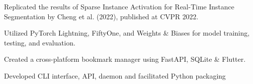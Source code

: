 \documentclass[]{resume-template}
\begin{document}
\begin{minipage}[t]{0.66\textwidth}
  \label{subsec:sparseinst}
  \begin{tightemize}
  \item Replicated the results of Sparse Instance Activation for
    Real-Time Instance Segmentation by Cheng et al. (2022), published
    at CVPR 2022.
  \item Utilized PyTorch Lightning, FiftyOne, and Weights \& Biases
    for model training, testing, and evaluation.

  \end{tightemize}
  \label{subsec: Bookie}
  \begin{tightemize}
  \item Created a cross-platform bookmark manager using FastAPI,
    SQLite \& Flutter.
  \item Developed CLI interface, API, daemon and facilitated Python packaging
  \end{tightemize}


\end{minipage}
\end{document}

